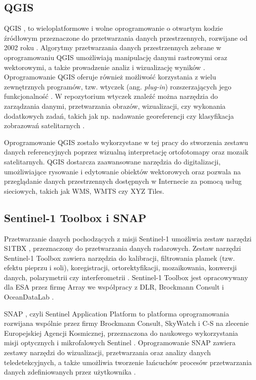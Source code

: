 \documentclass{amuthesis}
\begin{document}
\hypertarget{qgis}{%
\subsection{QGIS}\label{qgis}}

QGIS \autocite{qgis}, to wieloplatformowe i wolne oprogramowanie o
otwartym kodzie źródłowym przeznaczone do przetwarzania danych
przestrzennych, rozwijane od 2002 roku
\autocite{hejmanowska_2020_dane,flenniken_2020_qgis}. Algorytmy
przetwarzania danych przestrzennych zebrane w oprogramowaniu QGIS
umożliwiają manipulację danymi rastrowymi oraz wektorowymi, a także
prowadzenie analiz i wizualizację wyników
\autocite{hejmanowska_2020_dane}. Oprogramowanie QGIS oferuje również
możliwość korzystania z wielu zewnętrznych programów, tzw. wtyczek (ang.
\emph{plug-in}) rozszerzających jego funkcjonalność
\autocite{hejmanowska_2020_dane}. W repozytorium wtyczek znaleźć można
narzędzia do zarządzania danymi, przetwarzania obrazów, wizualizacji,
czy wykonania dodatkowych zadań, takich jak np. nadawanie georeferencji
czy klasyfikacja zobrazowań satelitarnych
\autocite{hejmanowska_2020_dane}.

Oprogramowanie QGIS zostało wykorzystane w tej pracy do stworzenia
zestawu danych referencyjnych poprzez wizualną interpretację
ortofotomapy oraz mozaik satelitarnych. QGIS dostarcza zaawansowane
narzędzia do digitalizacji, umożliwiające rysowanie i edytowanie
obiektów wektorowych oraz pozwala na przeglądanie danych przestrzennych
dostępnych w Internecie za pomocą usług sieciowych, takich jak WMS, WMTS
czy XYZ Tiles.

\hypertarget{sentinel-1-toolbox-i-snap}{%
\subsection{Sentinel-1 Toolbox i SNAP}\label{sentinel-1-toolbox-i-snap}}

Przetwarzanie danych pochodzących z misji Sentinel-1 umożliwia zestaw
narzędzi S1TBX \autocite{s1tbx}, przeznaczony do przetwarzania danych
radarowych. Zestaw narzędzi Sentinel-1 Toolbox zawiera narzędzia do
kalibracji, filtrowania plamek (tzw. efektu pieprzu i soli),
koregistracji, ortorektyfikacji, mozaikowania, konwersji danych,
polarymetrii czy interferometrii \autocite{sentinel-1-toolbox}.
Sentinel-1 Toolbox jest opracowywany dla ESA przez firmę Array we
współpracy z DLR, Brockmann Consult i OceanDataLab
\autocite{sentinel-1-toolbox}.

SNAP \autocite{snap}, czyli Sentinel Application Platform to platforma
oprogramowania rozwijana wspólnie przez firmy Brockmann Consult,
SkyWatch i C-S na zlecenie Europejskiej Agencji Kosmicznej, przeznaczona
do naukowego wykorzystania misji optycznych i mikrofalowych Sentinel
\autocite{snap-desktop,esa_snap}. Oprogramowanie SNAP zawiera zestawy
narzędzi do wizualizacji, przetwarzania oraz analizy danych
teledetekcyjnych, a także umożliwia tworzenie łańcuchów procesów
przetwarzania danych zdefiniowanych przez użytkownika
\autocite{hejmanowska_2020_dane,moskolai_2022_s1_workflow}.
\end{document}
